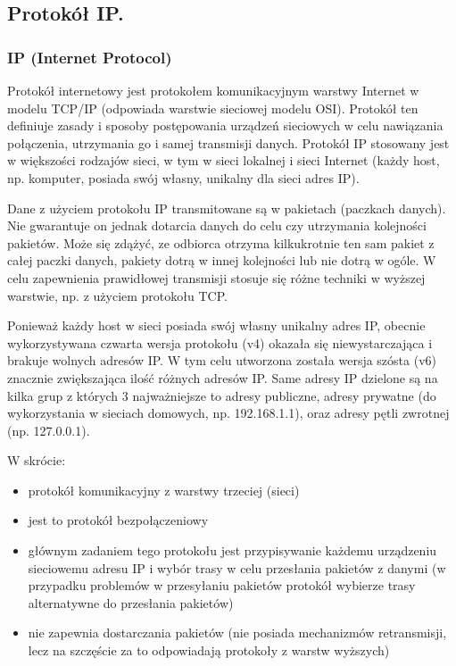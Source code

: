 \documentclass[a4paper,12pt,oneside]{book}
\begin{document}
							
			
			\newpage\subsection{Protokół IP.}
				\subsubsection{IP (Internet Protocol)}
				Protokół internetowy jest protokołem komunikacyjnym warstwy Internet w modelu TCP/IP (odpowiada warstwie sieciowej modelu OSI). Protokół ten definiuje zasady i sposoby postępowania urządzeń sieciowych w celu nawiązania połączenia, utrzymania go i samej transmisji danych. Protokół IP stosowany jest w większości rodzajów sieci, w tym w sieci lokalnej i sieci Internet (każdy host, np. komputer, posiada swój własny, unikalny dla sieci adres IP).
				
				Dane z użyciem protokołu IP transmitowane są w pakietach (paczkach danych). Nie gwarantuje on jednak dotarcia danych do celu czy utrzymania kolejności pakietów. Może się zdążyć, ze odbiorca otrzyma kilkukrotnie ten sam pakiet z całej paczki danych, pakiety dotrą w innej kolejności lub nie dotrą w ogóle. W celu zapewnienia prawidłowej transmisji stosuje się różne techniki w wyższej warstwie, np. z użyciem protokołu TCP.
				
				Ponieważ każdy host w sieci posiada swój własny unikalny adres IP, obecnie wykorzystywana czwarta wersja protokołu (v4) okazała się niewystarczająca i brakuje wolnych adresów IP. W tym celu utworzona została wersja szósta (v6) znacznie zwiększająca ilość różnych adresów IP. Same adresy IP dzielone są na kilka grup z których 3 najważniejsze to adresy publiczne, adresy prywatne (do wykorzystania w sieciach domowych, np. 192.168.1.1), oraz adresy pętli zwrotnej (np. 127.0.0.1).
				
				W skrócie:
				\begin{itemize}
					\item protokół komunikacyjny z warstwy trzeciej (sieci)
					\item jest to protokół bezpołączeniowy
					\item głównym zadaniem tego protokołu jest przypisywanie każdemu urządzeniu
					sieciowemu adresu IP i wybór trasy w celu przesłania pakietów z danymi (w
					przypadku problemów w przesyłaniu pakietów protokół wybierze trasy alternatywne
					do przesłania pakietów)
					\item nie zapewnia dostarczania pakietów (nie posiada mechanizmów retransmisji, lecz na
					szczęście za to odpowiadają protokoły z warstw wyższych)
				\end{itemize}
\end{document}
